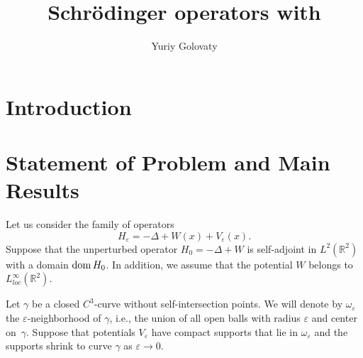 \documentclass[graybox]{svmult}
\newcommand{\dom}{\mathop{\rm dom}}
\newcommand{\Real}{\mathbb R}
\newcommand{\eps}{\varepsilon}
\begin{document}
\title*{Schr\"{o}dinger operators with}
\author{Yuriy Golovaty}

\maketitle






\section{Introduction  }
\label{Sec:Introduction}




\section{Statement of Problem and Main Results}
\label{Sec:Statment}

Let us consider the family of operators
\begin{equation}\label{OprHe}
H_\eps=-\Delta +W(x)+V_\eps(x).
\end{equation}
Suppose that the unperturbed operator $H_0=-\Delta +W$ is self-adjoint in $L^2(\Real^2)$ with a domain $\dom H_0$. In addition, we assume that the potential $W$ belongs to $L^\infty_{loc}(\Real^2)$.

Let $\gamma$ be a  closed $C^3$-curve without self-intersection
points. We will denote by $\omega_\eps$ the $\eps$-neighborhood of $\gamma$, i.e., the union of all open balls with radius $\eps$ and center on~$\gamma$.  Suppose that potentials $V_\eps$ have compact supports that lie in $\omega_\eps$ and  the supports  shrink to curve $\gamma$ as $\eps\to 0$.
\end{document}
